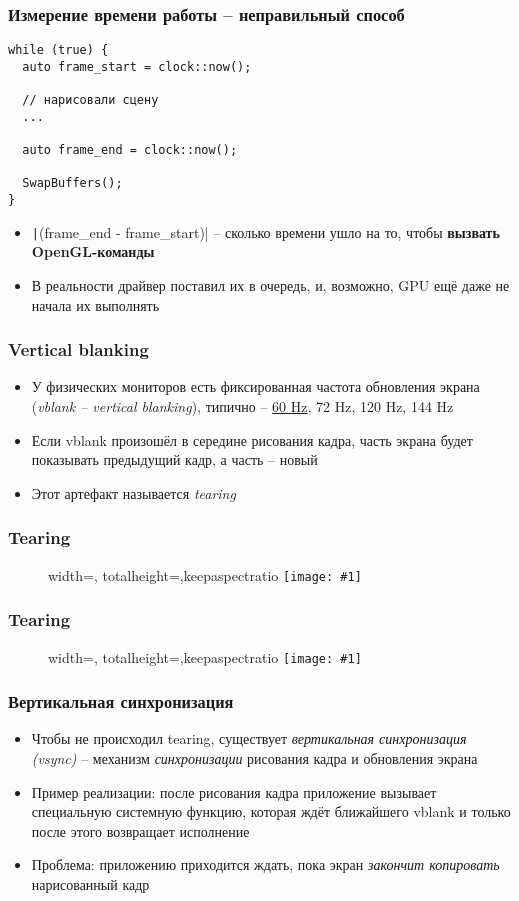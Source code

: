 \documentclass{beamer}
\newcommand{\slideimage}[1]{
  \begin{figure}
    \begin{adjustbox}{width=\textwidth, totalheight=\textheight-2\baselineskip-2\baselineskip,keepaspectratio}
      \texttt{[image: \#1]}
    \end{adjustbox}
  \end{figure}
}
\begin{document}
\begin{frame}[fragile]
\frametitle{Измерение времени работы -- неправильный способ}
\begin{verbatim}
while (true) {
  auto frame_start = clock::now();

  // нарисовали сцену
  ...

  auto frame_end = clock::now();

  SwapBuffers();
}
\end{verbatim}
\pause
\begin{itemize}
\item \texttt|(frame_end - frame_start)| -- сколько времени ушло на то, чтобы \textbf{вызвать OpenGL-команды}
\pause
\item В реальности драйвер поставил их в очередь, и, возможно, GPU ещё даже не начала их выполнять
\end{itemize}
\end{frame}

\begin{frame}[fragile]
\frametitle{Vertical blanking}
\begin{itemize}
\item У физических мониторов есть фиксированная частота обновления экрана (\textit{vblank -- vertical blanking}), типично -- \underline{60 Hz}, 72 Hz, 120 Hz, 144 Hz
\pause
\item Если vblank произошёл в середине рисования кадра, часть экрана будет показывать предыдущий кадр, а часть -- новый
\pause
\item Этот артефакт называется \textit{tearing}
\end{itemize}
\end{frame}

\begin{frame}[fragile]
\frametitle{Tearing}
\slideimage{tearing.png}
\end{frame}

\begin{frame}[fragile]
\frametitle{Tearing}
\slideimage{tearing_border.png}
\end{frame}

\begin{frame}[fragile]
\frametitle{Вертикальная синхронизация}
\begin{itemize}
\item Чтобы не происходил tearing, существует \textit{вертикальная синхронизация (vsync)} -- механизм \textit{синхронизации} рисования кадра и обновления экрана
\pause
\item Пример реализации: после рисования кадра приложение вызывает специальную системную функцию, которая ждёт ближайшего vblank и только после этого возвращает исполнение
\pause
\item Проблема: приложению приходится ждать, пока экран \textit{закончит копировать} нарисованный кадр
\end{itemize}
\end{frame}
\end{document}
